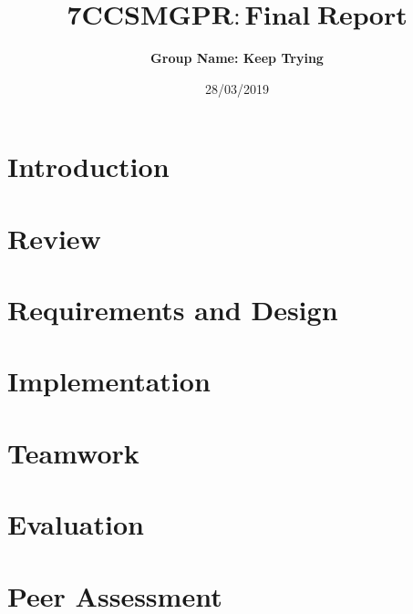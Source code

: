 \documentclass[12pt]{article}
\title{\Huge $\mathbf{7CCSMGPR: 
Final \; Report}$}
\author{\Large \textbf{Group Name: Keep Trying} }
\date{28/03/2019}
\begin{document}
\maketitle

\thispagestyle{empty}

\newpage

\thispagestyle{empty}




\newpage
\setcounter{page}{1}
\vspace{5cm}


\section{Introduction}


\section{Review}
\label{Sec2}


\section{Requirements and Design}
\label{Sec3}


\section{Implementation}
\label{Sec4}


\section{Teamwork}
\label{Sec5}


\section{Evaluation}
\label{Sec6}


\section{Peer Assessment}
\label{Sec7}









\clearpage
{} %


\appendix
\end{document}
